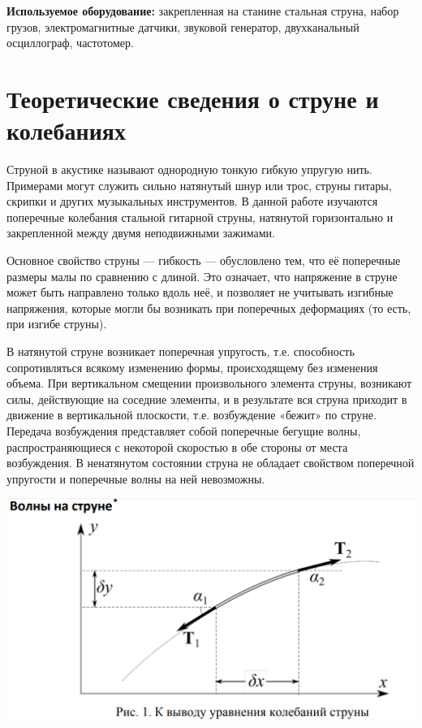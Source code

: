 \documentclass[a4paper, 12pt]{article} %
\begin{document}
\textbf{Используемое оборудование:} закрепленная на станине стальная струна, набор грузов,
электромагнитные датчики, звуковой генератор, двухканальный осциллограф, частотомер.

\section{Теоретические сведения о струне и колебаниях}

Струной в акустике называют однородную тонкую гибкую упругую нить. Примерами могут служить сильно натянутый шнур или трос, струны гитары, скрипки и других музыкальных инструментов. В данной работе изучаются поперечные колебания стальной гитарной струны, натянутой горизонтально и закрепленной между двумя неподвижными зажимами.

Основное свойство струны — гибкость — обусловлено тем, что её поперечные размеры малы по сравнению с длиной. Это означает, что напряжение
в струне может быть направлено только вдоль неё, и позволяет не учитывать
изгибные напряжения, которые могли бы возникать при поперечных деформациях (то есть, при изгибе струны).

В натянутой струне возникает поперечная упругость, т.е. способность сопротивляться всякому изменению формы, происходящему без изменения
объема. При вертикальном смещении произвольного элемента струны, возникают силы, действующие на соседние элементы, и в результате вся струна
приходит в движение в вертикальной плоскости, т.е. возбуждение «бежит» по
струне. Передача возбуждения представляет собой поперечные бегущие
волны, распространяющиеся с некоторой скоростью в обе стороны от места
возбуждения. В ненатянутом состоянии струна не обладает свойством поперечной упругости и поперечные волны на ней невозможны.

\includegraphics[width=\textwidth]{1.4.5 1}
\end{document}
